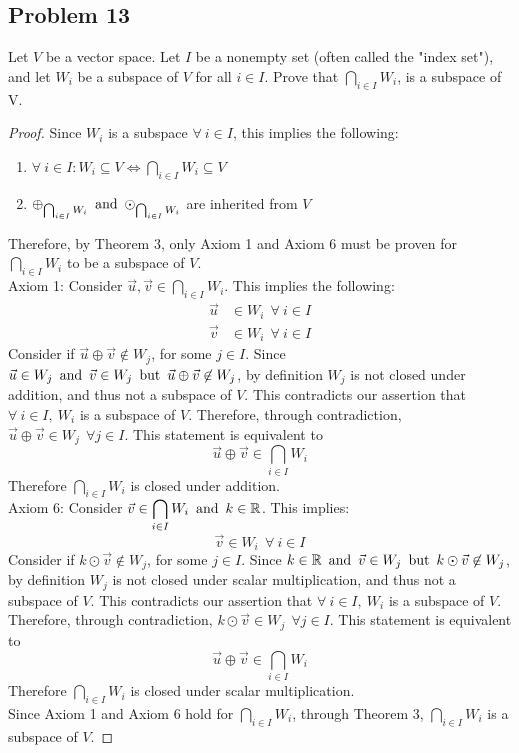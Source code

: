 \subsection*{Problem 13}
Let $V$ be a vector space. Let $I$ be a nonempty set (often called the "index set"), and let $W_i$ be a subspace of $V$ for all $i \in I$. Prove that $\displaystyle \bigcap_{i \in I} W_i$, is a subspace of V.
\begin{proof}
  Since $W_i$ is a subspace $\forall~i \in I$, this implies the following:
  \begin{enumerate}
    \item $\forall~i \in I: W_i \subseteq V \Leftrightarrow \displaystyle \bigcap_{i \in I} W_i \subseteq V$
    \item $\oplus_{\bigcap_{i \in I} W_i} \operatorname{~\text{and}~} \odot_{\bigcap_{i \in I} W_i}$ are inherited from $V$
  \end{enumerate}
  Therefore, by Theorem 3, only Axiom 1 and Axiom 6 must be proven for $\displaystyle \bigcap_{i \in I} W_i$ to be a subspace of $V$. \\
  Axiom 1: Consider $\vec{u}, \vec{v} \in \displaystyle \bigcap_{i \in I} W_i$. This implies the following:
  \begin{align*}
    \vec{u} & \in W_i~~\forall~i \in I \\
    \vec{v} & \in W_i~~\forall~i \in I
  \end{align*}
  Consider if $\vec{u} \oplus \vec{v} \not \in W_j$, for some $j \in I$. Since $\vec{u} \in W_j \operatorname{~\text{and}~} \vec{v} \in W_j \operatorname{~\text{but}~} \vec{u} \oplus \vec{v} \not \in W_j$, by definition $W_j$ is not closed under addition, and thus not a subspace of $V$. This contradicts our assertion that $\forall~i \in I,~W_i$ is a subspace of $V$. Therefore, through contradiction, $\vec{u} \oplus \vec{v} \in W_j~~\forall j \in I$. This statement is equivalent to
  \[
    \vec{u} \oplus \vec{v} \in \bigcap_{i \in I} W_i
  \]
  Therefore $\displaystyle \bigcap_{i \in I} W_i$ is closed under addition. \\
  Axiom 6: Consider $\vec{v} \in \displaystyle \bigcap_{i \in I} W_i \operatorname{~\text{and}~} k \in \mathbb{R}$. This implies:
  \[
    \vec{v} \in W_i~~\forall~i \in I
  \]
  Consider if $k \odot \vec{v} \not \in W_j$, for some $j \in I$. Since $k \in \mathbb{R} \operatorname{~\text{and}~} \vec{v} \in W_j \operatorname{~\text{but}~} k \odot \vec{v} \not \in W_j$, by definition $W_j$ is not closed under scalar multiplication, and thus not a subspace of $V$. This contradicts our assertion that $\forall~i \in I,~W_i$ is a subspace of $V$. Therefore, through contradiction, $k \odot \vec{v} \in W_j~~\forall j \in I$. This statement is equivalent to
  \[
    \vec{u} \oplus \vec{v} \in \bigcap_{i \in I} W_i
  \]
  Therefore $\displaystyle \bigcap_{i \in I} W_i$ is closed under scalar multiplication. \\
  Since Axiom 1 and Axiom 6 hold for $\displaystyle \bigcap_{i \in I} W_i$, through Theorem 3, $\displaystyle \bigcap_{i \in I} W_i$ is a subspace of $V$.
\end{proof}

